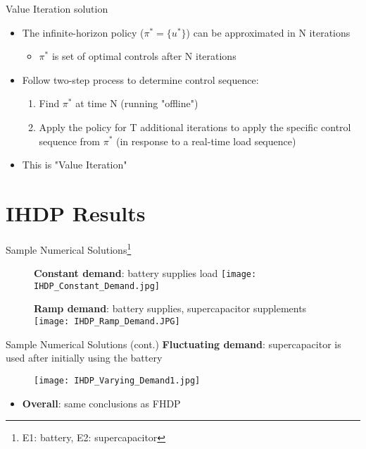 \documentclass{beamer}
\begin{document}
\begin{frame}{Value Iteration solution}
\begin{itemize}
\item The infinite-horizon policy  ($\pi^{*}=\{u^{*}\}$) can be approximated in N iterations
\begin{itemize}
\item $\pi^{*}$ is set of optimal controls after N iterations
\end{itemize}
\item Follow two-step process to determine control sequence:
\begin{enumerate}
\item Find $\pi^{*}$ at time N (running "offline")
\item Apply the policy for T additional iterations to apply the specific control sequence from $\pi^{*}$ (in response to a real-time load sequence)
\end{enumerate}
\item This is "Value Iteration"
\end{itemize}
\end{frame}

\section{IHDP Results}
\begin{frame}{Sample Numerical Solutions\footnote{E1: battery, E2: supercapacitor}}
\begin{minipage}{0.5\textwidth}
\begin{figure}
\textbf{Constant demand}: battery supplies load
\texttt{[image: IHDP\_Constant\_Demand.jpg]}
\end{figure}
\end{minipage}\begin{minipage}{0.5\textwidth}
\begin{figure}
\textbf{Ramp demand}: battery supplies, supercapacitor supplements
\texttt{[image: IHDP\_Ramp\_Demand.JPG]}
\end{figure}
\end{minipage}
\end{frame}

\begin{frame}{Sample Numerical Solutions (cont.)}
\textbf{Fluctuating demand}: supercapacitor is used after initially using the battery
\begin{figure}
\texttt{[image: IHDP\_Varying\_Demand1.jpg]}
\end{figure}

\begin{itemize}
\item \textbf{Overall}: same conclusions as FHDP
\end{itemize}
\end{frame}
\end{document}
